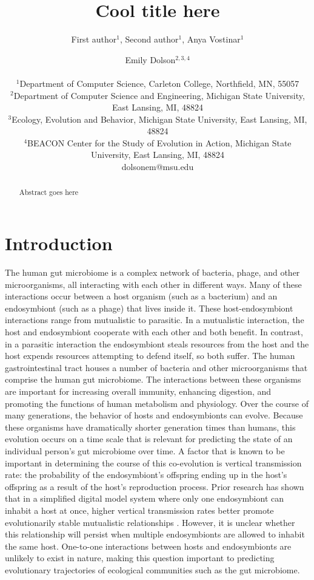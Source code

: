 \documentclass[letterpaper]{article}
\title{Cool title here}
\author{First author$^{1}$, Second author$^{1}$, Anya Vostinar$^{1}$ \and Emily Dolson$^{2,3,4}$ \\
\mbox{}\\
$^1$Department of Computer Science, Carleton College, Northfield, MN, 55057 \\
$^2$Department of Computer Science and Engineering, Michigan State University, East Lansing, MI, 48824 \\
$^3$Ecology, Evolution and Behavior, Michigan State University, East Lansing, MI, 48824 \\
$^4$BEACON Center for the Study of Evolution in Action, Michigan State University, East Lansing, MI, 48824 \\
dolsonem@msu.edu} %
\begin{document}
\maketitle

\begin{abstract}
Abstract goes here
\end{abstract}

\section{Introduction}


The human gut microbiome is a complex network of bacteria, phage, and other microorganisms, all interacting with each other in different ways. Many of these interactions occur between a host organism (such as a bacterium) and an endosymbiont (such as a phage) that lives inside it. These host-endosymbiont interactions range from mutualistic to parasitic. In a mutualistic interaction, the host and endosymbiont cooperate with each other and both benefit. In contrast, in a parasitic interaction the endosymbiont steals resources from the host and the host expends resources attempting to defend itself, so both suffer. The human gastrointestinal tract houses a number of bacteria and other microorganisms that comprise the human gut microbiome. The interactions between these organisms are important for increasing overall immunity, enhancing digestion, and promoting the functions of human metabolism and physiology. Over the course of many generations, the behavior of hosts and endosymbionts can evolve. Because these organisms have dramatically shorter generation times than humans, this evolution occurs on a time scale that is relevant for predicting the state of an individual person's gut microbiome over time. A factor that is known to be important in determining the course of this co-evolution is vertical transmission rate: the probability of the endosymbiont's offspring ending up in the host's offspring as a result of the host's reproduction process.  Prior research has shown that in a simplified digital model system where only one endosymbiont can inhabit a host at once, higher vertical transmission rates better promote evolutionarily stable mutualistic relationships \citep{vostinar_SpatialStructureCan_2019}. However, it is unclear whether this relationship will persist when multiple endosymbionts are allowed to inhabit the same host. One-to-one interactions between hosts and endosymbionts are unlikely to exist in nature, making this question important to predicting evolutionary trajectories of ecological communities such as the gut microbiome. 
\end{document}
